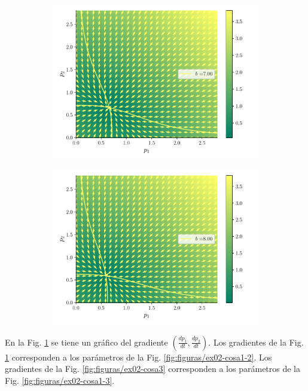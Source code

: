 \documentclass[twocolumn,aps,prl]{revtex4-1}
\begin{document}
\begin{figure}[ht!]
\begin{subfigure}[b]{0.49\linewidth}
      \includegraphics[width = 0.999\textwidth]{figuras/ex02-cosa2-6.pdf}
  \end{subfigure}\quad
  \begin{subfigure}[b]{0.49\linewidth}
      \centering
      \includegraphics[width = 0.999\textwidth]{figuras/ex02-cosa2-7.pdf}
  \end{subfigure}\quad
  \caption{}
  \label{fig:figuras/ex02-cosa2}
\end{figure}

En la Fig. \ref{fig:figuras/ex02-cosa2} se tiene un gráfico del gradiente $(\frac{dp_1}{dt}, \frac{dp_2}{dt})$. Los gradientes de la Fig. \ref{fig:figuras/ex02-cosa2} corresponden a los parámetros de la Fig. \ref{fig:figuras/ex02-cosa1-2}. Los gradientes de la Fig. \ref{fig:figuras/ex02-cosa3} corresponden a los parámetros de la Fig. \ref{fig:figuras/ex02-cosa1-3}.
\end{document}
